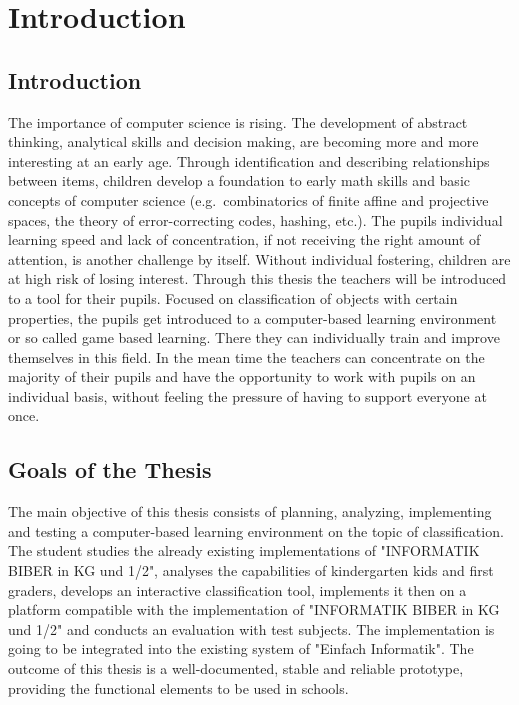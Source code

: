 
\setcounter{chapter}{0}

\chapter{Introduction}\label{ch:introduction}
\section{Introduction}\label{sec:introduction}
The importance of computer science is rising.
The development of abstract thinking, analytical skills and decision making,
are becoming more and more interesting at an early age.
Through identification and describing relationships between items,
children develop a foundation to early math skills and basic concepts of computer science
(e.g.\ combinatorics of finite affine and projective spaces, the theory of error-correcting codes, hashing, etc.)\cite{cardgameset}.
The pupils individual learning speed and lack of concentration,
if not receiving the right amount of attention, is another challenge by itself.
Without individual fostering, children are at high risk of losing interest.
Through this thesis the teachers will be introduced to a tool for their pupils.
Focused on classification of objects with certain properties, the pupils get introduced to a computer-based
learning environment or so called game based learning.
There they can individually train and improve themselves in this field.
In the mean time the teachers can concentrate on the majority of their pupils and have the opportunity to work with
pupils on an individual basis, without feeling the pressure of having to support everyone at once.

\section{Goals of the Thesis}\label{sec:goals-of-the-thesis}
The main objective of this thesis consists of planning, analyzing, implementing
and testing a computer-based learning environment on the topic of
classification. The student studies the already existing implementations of
"INFORMATIK BIBER in KG und 1/2", analyses the capabilities of kindergarten kids
and first graders, develops an interactive classification tool, implements it
then on a platform compatible with the implementation of "INFORMATIK BIBER in KG
und 1/2"\cite{ibkg12} and conducts an evaluation with test subjects.
The implementation is going to be integrated into the existing system of "Einfach Informatik"\cite{einfachinformatik}.
The outcome of this thesis is a well-documented, stable and
reliable prototype, providing the functional elements to be used in schools.

